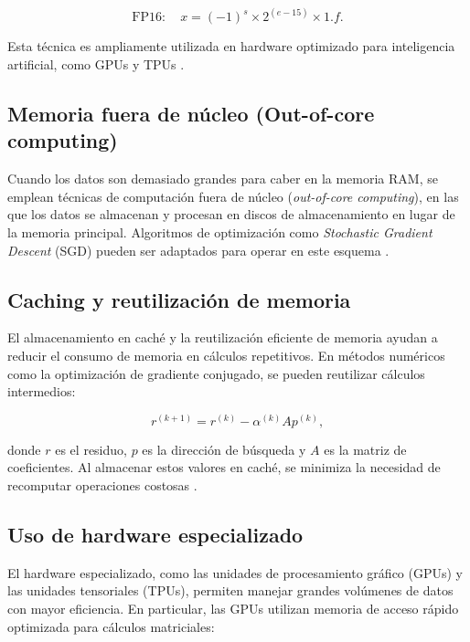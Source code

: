 \begin{itemize}
		\begin{equation}
			\text{FP16}: \quad x = (-1)^s \times 2^{(e-15)} \times 1.f.
		\end{equation}
		
		Esta técnica es ampliamente utilizada en hardware optimizado para inteligencia artificial, como GPUs y TPUs \cite{micikevicius2018mixed}.
		
		\subsection{Memoria fuera de núcleo (Out-of-core computing)}
		
		Cuando los datos son demasiado grandes para caber en la memoria RAM, se emplean técnicas de computación fuera de núcleo (\textit{out-of-core computing}), en las que los datos se almacenan y procesan en discos de almacenamiento en lugar de la memoria principal. Algoritmos de optimización como \textit{Stochastic Gradient Descent} (SGD) pueden ser adaptados para operar en este esquema \cite{re2010high}.
		
		\subsection{Caching y reutilización de memoria}
		
		El almacenamiento en caché y la reutilización eficiente de memoria ayudan a reducir el consumo de memoria en cálculos repetitivos. En métodos numéricos como la optimización de gradiente conjugado, se pueden reutilizar cálculos intermedios:
		
		\begin{equation}
			r^{(k+1)} = r^{(k)} - \alpha^{(k)} A p^{(k)},
		\end{equation}
		
		donde \(r\) es el residuo, \(p\) es la dirección de búsqueda y \(A\) es la matriz de coeficientes. Al almacenar estos valores en caché, se minimiza la necesidad de recomputar operaciones costosas \cite{nocedal1999optimization}.
		
		\subsection{Uso de hardware especializado}
		
		El hardware especializado, como las unidades de procesamiento gráfico (GPUs) y las unidades tensoriales (TPUs), permiten manejar grandes volúmenes de datos con mayor eficiencia. En particular, las GPUs utilizan memoria de acceso rápido optimizada para cálculos matriciales:
		

\end{itemize}

